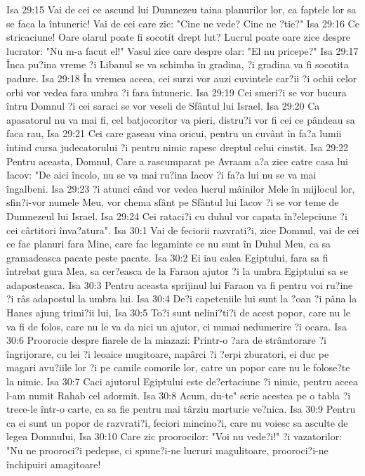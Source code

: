 Isa 29:15  Vai de cei ce ascund lui Dumnezeu taina planurilor lor, ca faptele lor sa se faca la întuneric! Vai de cei care zic: "Cine ne vede? Cine ne ?tie?"
Isa 29:16  Ce stricaciune! Oare olarul poate fi socotit drept lut? Lucrul poate oare zice despre lucrator: "Nu m-a facut el!" Vasul zice oare despre olar: "El nu pricepe?"
Isa 29:17  Înca pu?ina vreme ?i Libanul se va schimba în gradina, ?i gradina va fi socotita padure.
Isa 29:18  În vremea aceea, cei surzi vor auzi cuvintele car?ii ?i ochii celor orbi vor vedea fara umbra ?i fara întuneric.
Isa 29:19  Cei smeri?i se vor bucura întru Domnul ?i cei saraci se vor veseli de Sfântul lui Israel.
Isa 29:20  Ca apasatorul nu va mai fi, cel batjocoritor va pieri, distru?i vor fi cei ce pândeau sa faca rau,
Isa 29:21  Cei care gaseau vina oricui, pentru un cuvânt în fa?a lumii întind cursa judecatorului ?i pentru nimic rapesc dreptul celui cinstit.
Isa 29:22  Pentru aceasta, Domnul, Care a rascumparat pe Avraam a?a zice catre casa lui Iacov: "De aici încolo, nu se va mai ru?ina Iacov ?i fa?a lui nu se va mai îngalbeni.
Isa 29:23  ?i atunci când vor vedea lucrul mâinilor Mele în mijlocul lor, sfin?i-vor numele Meu, vor chema sfânt pe Sfântul lui Iacov ?i se vor teme de Dumnezeul lui Israel.
Isa 29:24  Cei rataci?i cu duhul vor capata în?elepciune ?i cei cârtitori înva?atura".
Isa 30:1  Vai de feciorii razvrati?i, zice Domnul, vai de cei ce fac planuri fara Mine, care fac legaminte ce nu sunt în Duhul Meu, ca sa gramadeasca pacate peste pacate.
Isa 30:2  Ei iau calea Egiptului, fara sa fi întrebat gura Mea, sa cer?easca de la Faraon ajutor ?i la umbra Egiptului sa se adaposteasca.
Isa 30:3  Pentru aceasta sprijinul lui Faraon va fi pentru voi ru?ine ?i râs adapostul la umbra lui.
Isa 30:4  De?i capeteniile lui sunt la ?oan ?i pâna la Hanes ajung trimi?ii lui,
Isa 30:5  To?i sunt nelini?ti?i de acest popor, care nu le va fi de folos, care nu le va da nici un ajutor, ci numai nedumerire ?i ocara.
Isa 30:6  Proorocie despre fiarele de la miazazi: Printr-o ?ara de strâmtorare ?i îngrijorare, cu lei ?i leoaice mugitoare, napârci ?i ?erpi zburatori, ei duc pe magari avu?iile lor ?i pe camile comorile lor, catre un popor care nu le folose?te la nimic.
Isa 30:7  Caci ajutorul Egiptului este de?ertaciune ?i nimic, pentru aceea l-am numit Rahab cel adormit.
Isa 30:8  Acum, du-te" scrie acestea pe o tabla ?i trece-le într-o carte, ca sa fie pentru mai târziu marturie ve?nica.
Isa 30:9  Pentru ca ei sunt un popor de razvrati?i, feciori mincino?i, care nu voiesc sa asculte de legea Domnului,
Isa 30:10  Care zic proorocilor: "Voi nu vede?i!" ?i vazatorilor: "Nu ne prooroci?i pedepse, ci spune?i-ne lucruri magulitoare, prooroci?i-ne închipuiri amagitoare!
